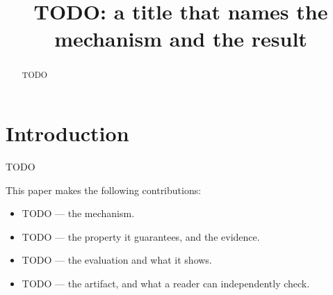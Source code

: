 \documentclass[letterpaper,twocolumn,10pt]{article}
\begin{document}
\title{\Large \bf TODO: a title that names the mechanism and the result}

\author{}                            %
\date{}

\maketitle

\begin{abstract}
TODO
\end{abstract}

\section{Introduction}
%

TODO

\noindent This paper makes the following contributions:
\begin{itemize}
  \item TODO --- the mechanism.
  \item TODO --- the property it guarantees, and the evidence.
  \item TODO --- the evaluation and what it shows.
  \item TODO --- the artifact, and what a reader can independently check.
\end{itemize}
\end{document}
